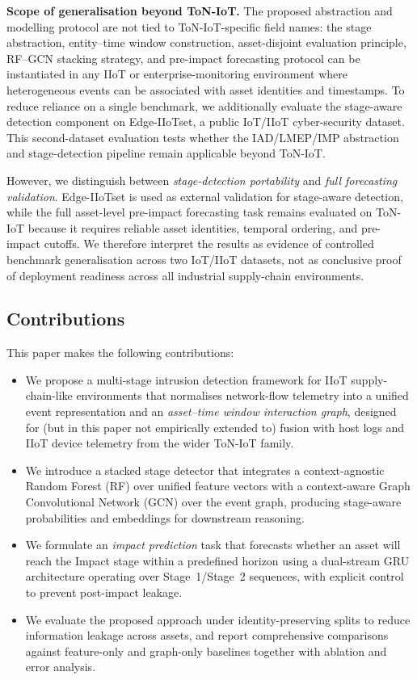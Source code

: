 \documentclass[pdflatex,sn-mathphys-num]{sn-jnl}
\theoremstyle{thmstyleone}%
\theoremstyle{thmstyletwo}%
\theoremstyle{thmstylethree}%
\begin{document}
\color{red}
\textbf{Scope of generalisation beyond ToN-IoT.}
The proposed abstraction and modelling protocol are not tied to ToN-IoT-specific field names: the stage abstraction, entity--time window construction, asset-disjoint evaluation principle, RF--GCN stacking strategy, and pre-impact forecasting protocol can be instantiated in any IIoT or enterprise-monitoring environment where heterogeneous events can be associated with asset identities and timestamps. To reduce reliance on a single benchmark, we additionally evaluate the stage-aware detection component on Edge-IIoTset, a public IoT/IIoT cyber-security dataset. This second-dataset evaluation tests whether the IAD/LMEP/IMP abstraction and stage-detection pipeline remain applicable beyond ToN-IoT.

However, we distinguish between \emph{stage-detection portability} and \emph{full forecasting validation}. Edge-IIoTset is used as external validation for stage-aware detection, while the full asset-level pre-impact forecasting task remains evaluated on ToN-IoT because it requires reliable asset identities, temporal ordering, and pre-impact cutoffs. We therefore interpret the results as evidence of controlled benchmark generalisation across two IoT/IIoT datasets, not as conclusive proof of deployment readiness across all industrial supply-chain environments.

\color{black}


\subsection{Contributions}
This paper makes the following contributions:
\begin{itemize}
    \item We propose a multi-stage intrusion detection framework for IIoT supply-chain-like environments that normalises network-flow telemetry into a unified event representation and an \emph{asset--time window interaction graph}, designed for (but in this paper not empirically extended to) fusion with host logs and IIoT device telemetry from the wider ToN-IoT family.
    \item We introduce a stacked stage detector that integrates a context-agnostic Random Forest (RF) over unified feature vectors with a context-aware Graph Convolutional Network (GCN) over the event graph, producing stage-aware probabilities and embeddings for downstream reasoning.
    \item We formulate an \emph{impact prediction} task that forecasts whether an asset will reach the Impact stage within a predefined horizon using a dual-stream GRU architecture operating over Stage~1/Stage~2 sequences, with explicit control to prevent post-impact leakage.
    \item We evaluate the proposed approach under identity-preserving splits to reduce information leakage across assets, and report comprehensive comparisons against feature-only and graph-only baselines together with ablation and error analysis.
\end{itemize}
\end{document}
